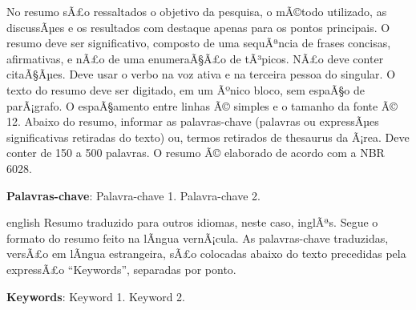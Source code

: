 \documentclass[
	12pt,				%
	oneside,			%
	a4paper,			%
	chapter=TITLE,		%
	section=TITLE,		%
	english,			%
	brazil				%
	]{abntex2}
\begin{document}
\setlength{\absparsep}{18pt} %
\begin{resumo}
	\SingleSpacing
  No resumo sÃ£o ressaltados o objetivo da pesquisa, o mÃ©todo utilizado, as discussÃµes e os resultados com destaque apenas para os pontos principais. O resumo deve ser significativo, composto de uma sequÃªncia de frases concisas, afirmativas, e nÃ£o de uma enumeraÃ§Ã£o de tÃ³picos. NÃ£o deve conter citaÃ§Ãµes. Deve usar o verbo na voz ativa e na terceira pessoa do singular. O texto do resumo deve ser digitado, em um Ãºnico bloco, sem espaÃ§o de parÃ¡grafo. O espaÃ§amento entre linhas Ã© simples e o tamanho da fonte Ã© 12. Abaixo do resumo, informar as palavras-chave (palavras ou expressÃµes significativas retiradas do texto) ou, termos retirados de thesaurus da Ã¡rea. Deve conter de 150 a 500 palavras. O resumo Ã© elaborado de acordo com a NBR 6028. 
  
  \textbf{Palavras-chave}: 
    Palavra-chave 1.
    Palavra-chave 2.
  \end{resumo}
\begin{resumo}[Abstract]
	\SingleSpacing
	\begin{otherlanguage*}{english}
		Resumo traduzido para outros idiomas, neste caso, inglÃªs. Segue o formato do resumo feito na lÃ­ngua vernÃ¡cula. As palavras-chave traduzidas, versÃ£o em lÃ­ngua estrangeira, sÃ£o colocadas abaixo do texto precedidas pela expressÃ£o ``Keywords'', separadas por ponto.
		
		\textbf{Keywords}:
	      Keyword 1.
        Keyword 2.
    	\end{otherlanguage*}
\end{resumo}
% 
%
%  
\end{document}
